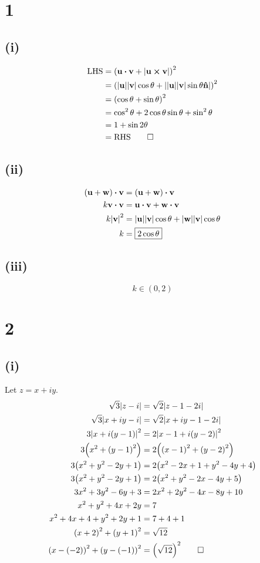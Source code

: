\documentclass[a4paper]{article}
\begin{document}
\section*{1}
\subsection*{(i)}
\[\begin{aligned}
    \text{LHS}&=\pqty{\vb u\vdot\vb v+\abs{\vb u\cross\vb v}}^2\\
    &=\pqty{\abs{\vb u}\abs{\vb v}\cos\theta+\abs{\abs{\vb u}\abs{\vb v}\sin\theta\vu n}}^2\\
    &=\pqty{\cos\theta+\sin\theta}^2\\
    &=\cos^2\theta+2\cos\theta\sin\theta+\sin^2\theta\\
    &=1+\sin2\theta\\
    &=\text{RHS}\qed
\end{aligned}\]
\subsection*{(ii)}
\[\begin{aligned}
    \pqty{\vb u+\vb w}\vdot\vb v&=\pqty{\vb u+\vb w}\vdot\vb v\\
    k\vb v\vdot\vb v&=\vb u\vdot\vb v+\vb w\vdot\vb v\\
    k\abs{\vb v}^2&=\abs{\vb u}\abs{\vb v}\cos\theta+\abs{\vb w}\abs{\vb v}\cos\theta\\
    k&=\boxed{2\cos\theta}
\end{aligned}\]
\subsection*{(iii)}
\[k\in\boxed{(0,2)}\]
\section*{2}
\subsection*{(i)}
Let \(z=x+iy\).
\[\begin{aligned}
    \sqrt3\abs{z-i}&=\sqrt2\abs{z-1-2i}\\
    \sqrt3\abs{x+iy-i}&=\sqrt2\abs{x+iy-1-2i}\\
    3\abs{x+i\pqty{y-1}}^2&=2\abs{x-1+i\pqty{y-2}}^2\\
    3\pqty{x^2+\pqty{y-1}^2}&=2\pqty{\pqty{x-1}^2+\pqty{y-2}^2}\\
    3\pqty{x^2+y^2-2y+1}&=2\pqty{x^2-2x+1+y^2-4y+4}\\
    3\pqty{x^2+y^2-2y+1}&=2\pqty{x^2+y^2-2x-4y+5}\\
    3x^2+3y^2-6y+3&=2x^2+2y^2-4x-8y+10\\
    x^2+y^2+4x+2y&=7\\
    x^2+4x+4+y^2+2y+1&=7+4+1\\
    \pqty{x+2}^2+\pqty{y+1}^2&=\sqrt{12}\\
    \pqty{x-\pqty{-2}}^2+\pqty{y-\pqty{-1}}^2&=\pqty{\sqrt{12}}^2\qed\\
\end{aligned}\]
\end{document}
